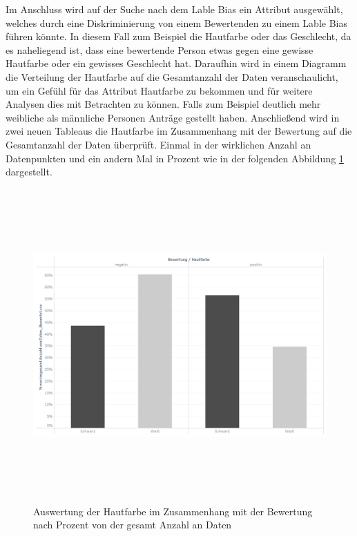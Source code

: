 \begin{onehalfspace}
Im Anschluss wird auf der Suche nach dem Lable Bias ein Attribut ausgewählt, welches durch eine Diskriminierung von einem Bewertenden zu einem Lable Bias führen könnte. In diesem Fall zum Beispiel die Hautfarbe oder das Geschlecht, da es naheliegend ist, dass eine bewertende Person etwas gegen eine gewisse Hautfarbe oder ein gewisses Geschlecht hat. Daraufhin wird in einem Diagramm die Verteilung der Hautfarbe auf die Gesamtanzahl der Daten veranschaulicht, um ein Gefühl für das Attribut Hautfarbe zu bekommen und für weitere Analysen dies mit Betrachten zu können. Falls zum Beispiel deutlich mehr weibliche als männliche Personen Anträge gestellt haben. Anschließend wird in zwei neuen Tableaus die Hautfarbe im Zusammenhang mit der Bewertung auf die Gesamtanzahl der Daten überprüft. Einmal in der wirklichen Anzahl an Datenpunkten und ein andern Mal in Prozent wie in der folgenden Abbildung \ref{fig:TabHaut1} dargestellt.
\begin{figure}[!h]
    \centering
    \includegraphics[width=16cm,height=12cm]{Diagramme/Tab_Haut1.PNG}
    \caption{Auswertung der Hautfarbe im Zusammenhang mit der Bewertung nach Prozent von der gesamt Anzahl an Daten}
    \label{fig:TabHaut1}
\end{figure}\\

\end{onehalfspace}
